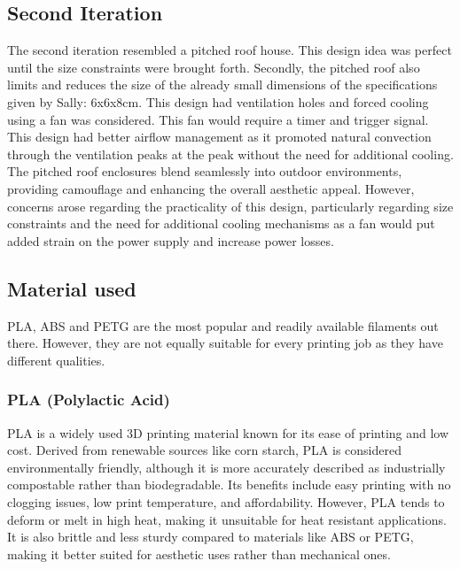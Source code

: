 \documentclass[class=report,11pt,crop=false]{standalone}
\begin{document}
\subsection{Second Iteration}
The second iteration resembled a pitched roof house. This design idea was perfect until the size constraints were brought forth. Secondly, the pitched roof also limits and reduces the size of the already small dimensions of the specifications given by Sally: 6x6x8cm. 
\newline
This design had ventilation holes and forced cooling using a fan was considered. This fan would require a timer and trigger signal. This design had better airflow management as it promoted natural convection through the ventilation peaks at the peak without the need for additional cooling. The pitched roof enclosures blend seamlessly into outdoor environments, providing camouflage and enhancing the overall aesthetic appeal. However, concerns arose regarding the practicality of this design, particularly regarding size constraints and the need for additional cooling mechanisms as a fan would put added strain on the power supply and increase power losses.
\newline

\subsection{Material used}
PLA, ABS and PETG are the most popular and readily available filaments out there. However, they are not equally suitable for every printing job as they have different qualities.
\newline

\subsubsection{PLA (Polylactic Acid)}
PLA is a widely used 3D printing material known for its ease of printing and low cost. Derived from renewable sources like corn starch, PLA is considered environmentally friendly, although it is more accurately described as industrially compostable rather than biodegradable. Its benefits include easy printing with no clogging issues, low print temperature, and affordability. However, PLA tends to deform or melt in high heat, making it unsuitable for heat resistant applications. It is also brittle and less sturdy compared to materials like ABS or PETG, making it better suited for aesthetic uses rather than mechanical ones.
\newline
\end{document}
